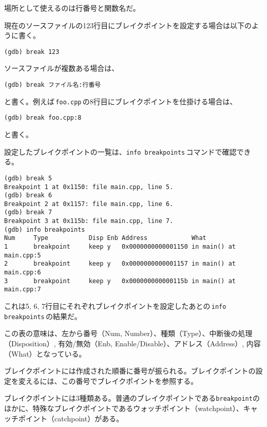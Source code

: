 場所として使えるのは行番号と関数名だ。


現在のソースファイルの123行目にブレイクポイントを設定する場合は以下のように書く。

\begin{lstlisting}[style=terminal]
(gdb) break 123
\end{lstlisting}

ソースファイルが複数ある場合は、
\begin{lstlisting}[style=terminal]
(gdb) break ファイル名:行番号
\end{lstlisting}
と書く。例えば\,\texttt{foo.cpp}\,の8行目にブレイクポイントを仕掛ける場合は、
\begin{lstlisting}[style=terminal]
(gdb) break foo.cpp:8
\end{lstlisting}
と書く。


設定したブレイクポイントの一覧は、\texttt{info breakpoints}\,コマンドで確認できる。

\begin{lstlisting}[style=terminal]
(gdb) break 5
Breakpoint 1 at 0x1150: file main.cpp, line 5.
(gdb) break 6
Breakpoint 2 at 0x1157: file main.cpp, line 6.
(gdb) break 7
Breakpoint 3 at 0x115b: file main.cpp, line 7.
(gdb) info breakpoints 
Num     Type           Disp Enb Address            What
1       breakpoint     keep y   0x0000000000001150 in main() at main.cpp:5
2       breakpoint     keep y   0x0000000000001157 in main() at main.cpp:6
3       breakpoint     keep y   0x000000000000115b in main() at main.cpp:7
\end{lstlisting}

これは5, 6, 7行目にそれぞれブレイクポイントを設定したあとの\,\texttt{info breakpoints}\,の結果だ。

この表の意味は、左から番号（Num, Number）、種類（Type）、中断後の処理（Disposition）, 有効/無効（Enb, Enable/Disable）、アドレス（Address）, 内容（What）となっている。

ブレイクポイントには作成された順番に番号が振られる。ブレイクポイントの設定を変えるには、この番号でブレイクポイントを参照する。

ブレイクポイントには3種類ある。普通のブレイクポイントである\texttt{breakpoint}のほかに、特殊なブレイクポイントであるウォッチポイント（watchpoint）、キャッチポイント（catchpoint）がある。

